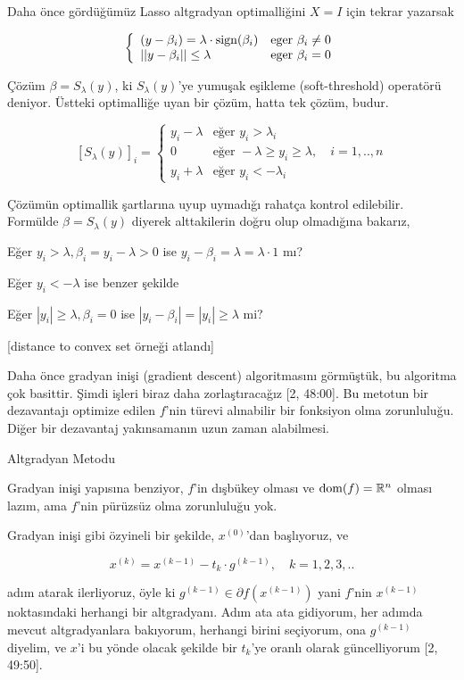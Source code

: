 \documentclass[12pt,fleqn]{article}\usepackage{../../common}
\begin{document}
Daha önce gördüğümüz Lasso altgradyan optimalliğini $X=I$  için tekrar
yazarsak

$$
\left\{ \begin{array}{ll}
(y-\beta_i) = \lambda \cdot \operatorname{sign}(\beta_i) & \textrm{eger } \beta_i \ne 0 \\
| |y-\beta_i|  | \le \lambda  & \textrm{eger } \beta_i = 0 
\end{array} \right.
$$

Çözüm $\beta = S_\lambda(y)$, ki $S_\lambda(y)$'ye yumuşak eşikleme
(soft-threshold) operatörü deniyor. Üstteki optimalliğe uyan bir çözüm,
hatta tek çözüm, budur.

$$
[ S_\lambda(y) ]_i = 
\left\{ \begin{array}{ll}
y_i - \lambda & \textrm{eğer } y_i > \lambda_i \\
0 & \textrm{eğer } -\lambda \ge y_i \ge \lambda, \quad i=1,..,n \\
y_i + \lambda & \textrm{eğer } y_i < -\lambda_i 
\end{array} \right.
$$

Çözümün optimallik şartlarına uyup uymadığı rahatça kontrol
edilebilir. Formülde $\beta=S_\lambda(y)$ diyerek alttakilerin doğru olup
olmadığına bakarız, 

Eğer $y_i > \lambda, \beta_i = y_i - \lambda > 0$ ise $y_i-\beta_i =
\lambda = \lambda \cdot 1$ mı?

Eğer $y_i < -\lambda$ ise benzer şekilde

Eğer $|y_i| \ge \lambda, \beta_i=0$ ise $|y_i-\beta_i| = |y_i| \ge \lambda$ mi?

[distance to convex set örneği atlandı]

Daha önce gradyan inişi (gradient descent) algoritmasını görmüştük, bu
algoritma çok basittir. Şimdi işleri biraz daha zorlaştıracağız [2,
48:00]. Bu metotun bir dezavantajı optimize edilen $f$'nin türevi
alınabilir bir fonksiyon olma zorunluluğu. Diğer bir dezavantaj
yakınsamanın uzun zaman alabilmesi.

Altgradyan Metodu

Gradyan inişi yapısına benziyor, $f$'in dışbükey olması ve
$\operatorname{dom}(f) = \mathbb{R}^n$ olması lazım, ama $f$'nin pürüzsüz olma
zorunluluğu yok.

Gradyan inişi gibi özyineli bir şekilde, $x^{(0)}$'dan başlıyoruz, ve

$$
x^{(k)} = x^{(k-1)} - t_k \cdot g^{(k-1)}, \quad k=1,2,3,..
$$

adım atarak ilerliyoruz, öyle ki $g^{(k-1)} \in \partial f(x^{(k-1)})$
yani $f$'nin $x^{(k-1)}$ noktasındaki herhangi bir altgradyanı. Adım ata
ata gidiyorum, her adımda mevcut altgradyanlara bakıyorum, herhangi birini
seçiyorum, ona $g^{(k-1)}$ diyelim, ve $x$'i bu yönde olacak şekilde bir
$t_k$'ye oranlı olarak güncelliyorum [2, 49:50]. 
\end{document}
